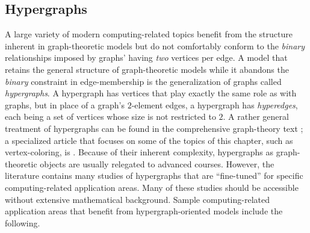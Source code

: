 \subsection{Hypergraphs}
\label{sec:hypergraphs}

A large variety of modern computing-related topics benefit from the structure inherent in 
graph-theoretic models but do not comfortably conform to the {\em binary} relationships 
imposed by graphs' having {\em two} vertices per edge.  A model that retains the general 
structure of graph-theoretic models while it abandons the {\em binary} constraint in
edge-membership is the generalization of graphs called {\em hypergraphs}.  A hypergraph has
vertices that play exactly the same role as with graphs, but in place of a graph's $2$-element 
edges, a hypergraph has {\em hyperedges}, each being a set of vertices whose size is not
restricted to $2$.  A rather general treatment of hypergraphs can be found in the comprehensive
graph-theory text \cite{Berge73}; a specialized article that focuses on some of the topics of this 
chapter, such as vertex-coloring, is \cite{Lovasz73}.  Because of their inherent complexity, 
hypergraphs as graph-theoretic objects are usually relegated to advanced courses.
However, the literature contains many studies of hypergraphs that are ``fine-tuned'' for specific
computing-related application areas.  Many of these studies should be accessible without 
extensive mathematical background.  Sample  computing-related application areas that benefit
from hypergraph-oriented models include the following.
